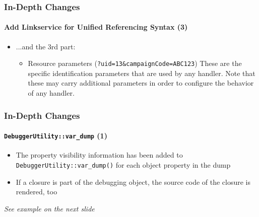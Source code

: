 \begin{frame}[fragile]
	\frametitle{In-Depth Changes}
	\framesubtitle{Add Linkservice for Unified Referencing Syntax (3)}

	\begin{itemize}

		\item ...and the 3rd part:

			\begin{itemize}

				\item Resource parameters (\texttt{?uid=13\&campaignCode=ABC123})\newline
					These are the specific identification parameters that are used by any handler.
					Note that these may carry additional parameters in order to configure the behavior of any handler.

			\end{itemize}

	\end{itemize}

\end{frame}

\begin{frame}[fragile]
	\frametitle{In-Depth Changes}
	\framesubtitle{\texttt{DebuggerUtility::var\_dump} (1)}

	\begin{itemize}

		\item The property visibility information has been added to \texttt{DebuggerUtility::var\_dump()}
			\newline
			for each object property in the dump

		\item If a closure is part of the debugging object, the source code of the closure is rendered, too

	\end{itemize}

	\tabto{0.75cm}\textit{See example on the next slide}

\end{frame}

